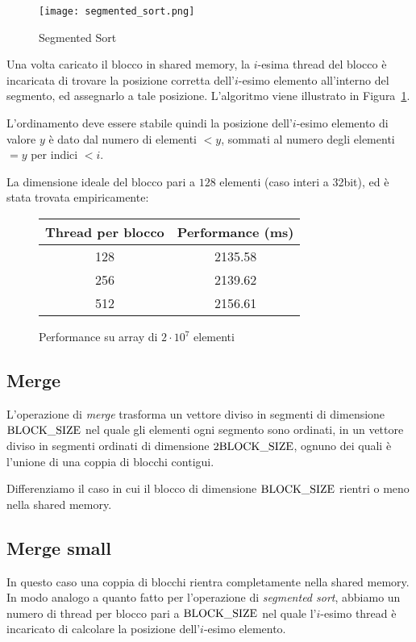 \begin{figure}[H]
\centering
	\texttt{[image: segmented\_sort.png]}
	\caption{Segmented Sort}
	\label{segmented_sort}
\end{figure}

Una volta caricato il blocco in shared memory, la $i$-esima thread del blocco è incaricata di trovare la posizione corretta dell'$i$-esimo elemento all'interno del segmento, ed assegnarlo a tale posizione. L'algoritmo viene illustrato in Figura~\ref{segmented_sort}. 

L'ordinamento deve essere stabile quindi la posizione dell'$i$-esimo elemento di valore $y$ è dato dal numero di elementi $<y$, sommati al numero degli elementi $=y$ per indici $<i$. 

La dimensione ideale del blocco pari a $128$ elementi (caso interi a 32bit), ed è stata trovata empiricamente:
\begin{figure}[H]
	\centering
	\begin{tabular}{SS}
		\toprule
		\textbf{Thread per blocco} & \textbf{Performance (\si{\milli\second})} \\   & 2135.58 \\
		256  & 2139.62 \\
		512  & 2156.61  \\ \bottomrule
	\end{tabular}
	\caption{Performance su array di $2\cdot 10^7$ elementi}
\end{figure}

\subsection{Merge}
\label{merge}
L'operazione di \emph{merge} trasforma un vettore diviso in segmenti di dimensione $\textrm{BLOCK\_SIZE}$ nel quale gli elementi ogni segmento sono ordinati, in un vettore diviso in segmenti ordinati di dimensione $2 \textrm{BLOCK\_SIZE}$, ognuno dei quali è l'unione di una coppia di blocchi contigui. 

Differenziamo il caso in cui il blocco di dimensione $\textrm{BLOCK\_SIZE}$ rientri o meno nella shared memory. 

\subsection{Merge small}

In questo caso una coppia di blocchi rientra completamente nella shared memory. In modo analogo a quanto fatto per l'operazione di \emph{segmented sort}, abbiamo un numero di thread per blocco pari a $\textrm{BLOCK\_SIZE}$ nel quale l'$i$-esimo thread è incaricato di calcolare la posizione dell'$i$-esimo elemento. 

